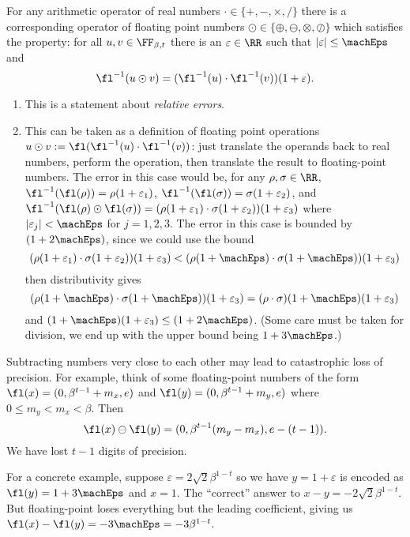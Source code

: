\begin{fundamentalAxiomFloat}
For any arithmetic operator of real numbers $\cdot\in\{+,-,\times,/\}$ there
is a corresponding operator of floating point numbers $\odot\in\{\oplus,\ominus,\otimes,\oslash\}$\index{$\ominus$}\index{$\oplus$}\index{$\otimes$}\index{$\oslash$}
which satisfies the property: for all $u,v\in\FF_{\beta,t}$ there is an
$\varepsilon\in\RR$ such that $|\varepsilon|\leq\machEps$ and
\begin{equation}
  \fl^{-1}(u\odot v) = (\fl^{-1}(u)\cdot\fl^{-1}(v))(1 + \varepsilon).
\end{equation}
\end{fundamentalAxiomFloat}
\begin{rmk}
  \begin{enumerate}
  \item This is a statement about \emph{relative errors}.
  \item This can be taken as a definition of floating point operations
    $u\odot v := \fl(\fl^{-1}(u)\cdot\fl^{-1}(v))$: just translate the
    operands back to real numbers, perform the operation, then translate
    the result to floating-point numbers. The error in this case would
    be, for any $\rho,\sigma\in\RR$,
    $\fl^{-1}(\fl(\rho))=\rho(1+\varepsilon_{1})$,
    $\fl^{-1}(\fl(\sigma))=\sigma(1+\varepsilon_{2})$, and $\fl^{-1}(\fl(\rho)\odot\fl(\sigma))=(\rho(1+\varepsilon_{1})\cdot\sigma(1+\varepsilon_{2}))(1+\varepsilon_{3})$
    where $|\varepsilon_{j}|<\machEps$ for
    $j=1,2,3$. The error in this case is bounded by $(1 + 2\machEps)$,
    since we could use the bound
    $$(\rho(1+\varepsilon_{1})\cdot\sigma(1+\varepsilon_{2}))(1+\varepsilon_{3})<(\rho(1+\machEps)\cdot\sigma(1+\machEps))(1+\varepsilon_{3})$$
    then distributivity gives $$(\rho(1+\machEps)\cdot\sigma(1+\machEps))(1+\varepsilon_{3})=(\rho\cdot\sigma)(1+\machEps)(1+\varepsilon_{3})$$
    and $(1+\machEps)(1+\varepsilon_{3})\leq(1 + 2\machEps)$.
    (Some care must be taken for division, we end up with the upper
    bound being $1+3\machEps$.)
  \end{enumerate}
\end{rmk}
\begin{note}
Subtracting numbers very close to each other may lead to catastrophic
loss of precision. For example, think of some floating-point numbers of
the form $\fl(x)=(0,\beta^{t-1}+m_x,e)$ and $\fl(y)=(0,\beta^{t-1}+m_{y},e)$ where $0\leq m_{y}<m_{x}<\beta$.
Then
\begin{equation}
  \fl(x)\ominus\fl(y) = (0,\beta^{t-1}(m_{y}-m_{x}),e-(t-1)).
\end{equation}
We have lost $t-1$ digits of precision.

For a concrete example, suppose $\varepsilon=2\sqrt{2}\beta^{1-t}$ so we
have $y=1+\varepsilon$ is encoded as
$\fl(y)=1+3\machEps$ and $x=1$. The ``correct'' answer
to $x-y=-2\sqrt{2}\beta^{1-t}$. But floating-point loses
everything but the leading coefficient, giving us
$\fl(x)-\fl(y)=-3\machEps = -3\beta^{1-t}$.
\end{note}

